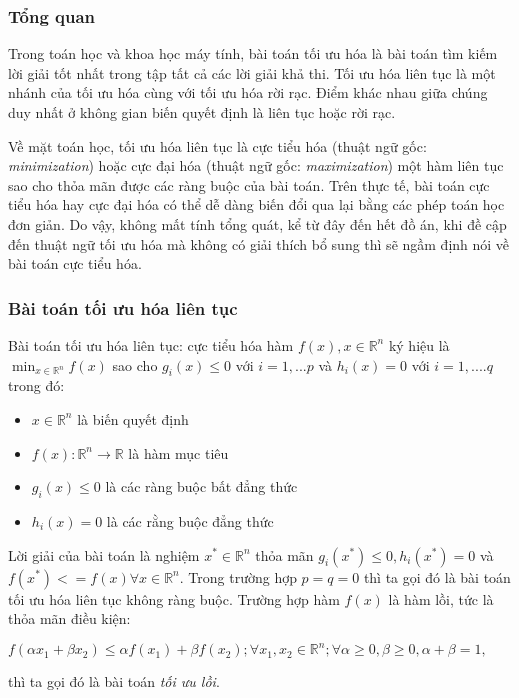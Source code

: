 \subsubsection{Tổng quan}
Trong toán học và khoa học máy tính, bài toán tối ưu hóa là bài toán tìm kiếm lời giải tốt nhất trong tập tất cả các lời giải khả thi. Tối ưu hóa liên tục là một nhánh của tối ưu hóa cùng với tối ưu hóa rời rạc. Điểm khác nhau giữa chúng duy nhất ở không gian biến quyết định là liên tục hoặc rời rạc.

Về mặt toán học, tối ưu hóa liên tục là cực tiểu hóa (thuật ngữ gốc: \textit{minimization}) hoặc cực đại hóa (thuật ngữ gốc: \textit{maximization}) một hàm liên tục sao cho thỏa mãn được các ràng buộc của bài toán. Trên thực tế, bài toán cực tiểu hóa hay cực đại hóa có thể dễ dàng biến đổi qua lại bằng các phép toán học đơn giản. Do vậy, không mất tính tổng quát, kể từ đây đến hết đồ án, khi đề cập đến thuật ngữ tối ưu hóa mà không có giải thích bổ sung thì sẽ ngầm định nói về bài toán cực tiểu hóa.

\subsubsection{Bài toán tối ưu hóa liên tục}
\begin{definition}
    Bài toán tối ưu hóa liên tục: cực tiểu hóa hàm $f(x), x\in \mathbb{R}^n$ ký hiệu là $\min_{x \in \mathbb{R}^n} f(x)$ sao cho $g_i(x) \leq 0$ với $i = 1,...p$ và $h_i(x) = 0$ với $i = 1,....q$ trong đó:
    \begin{itemize}
        \item $x \in \mathbb{R}^n$ là biến quyết định
        \item $f(x): \mathbb{R}^n \rightarrow \mathbb{R}$ là hàm mục tiêu
        \item $g_i(x) \leq 0$ là các ràng buộc bất đẳng thức
        \item $h_i(x) = 0$ là các rằng buộc đẳng thức
    \end{itemize}
\end{definition}
    Lời giải của bài toán là nghiệm $x^* \in \mathbb{R}^n$ thỏa mãn $g_i(x^*) \leq 0, h_i(x^*) = 0$ và $f(x^*) <= f(x) \forall x \in \mathbb{R}^n$. Trong trường hợp $p = q = 0$ thì ta gọi đó là bài toán tối ưu hóa liên tục không ràng buộc. Trường hợp hàm $f(x)$ là hàm lồi, tức là thỏa mãn điều kiện:
    \begin{center}
    $f(\alpha x_1 + \beta x_2) \leq \alpha f(x_1) + \beta f(x_2); \forall x_1,x_2 \in \mathbb{R}^n; \forall \alpha \geq 0, \beta \geq 0, \alpha + \beta = 1,$
    \end{center} thì ta gọi đó là bài toán \textit{tối ưu lồi}.
    
